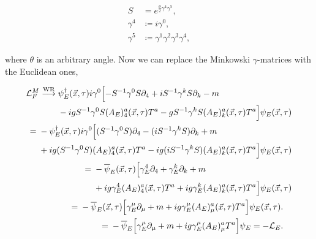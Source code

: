 \documentclass{article}
\theoremstyle{plain} %
\theoremstyle{convention} %
\theoremstyle{remark} %
\numberwithin{equation}{section}
\begin{document}
\begin{align*}
    S &= e^{\frac{\theta}{2} \gamma^4 \gamma^5 }, \\
    \gamma^4 &\coloneqq i \gamma^0, \\
    \gamma^5 &\coloneqq \gamma^1 \gamma^2 \gamma^3 \gamma^4,
\end{align*}

where $\theta$ is an arbitrary angle. Now we can replace the Minkowski $\gamma$-matrices with the Euclidean ones,

\begin{align*}
\begin{split}
    \mathcal{L}_{F}^M \stackrel{\text{WR}}{\longrightarrow}{}& \psi_E^{\dagger}(\vec{x},\tau) i \gamma^0 \Bigl[ - S^{-1} \gamma^0 S \partial_4 + i S^{-1} \gamma^k S \partial_k - m\\
         & - i g S^{-1} \gamma^0 S (A_E)_4^a(\vec{x}, \tau) T^a - g S^{-1} \gamma^k S (A_E)_k^a(\vec{x}, \tau) T^a \Bigr] \psi_E(\vec{x},\tau)
\end{split} \\
\begin{split}
    ={}& - \psi_E^{\dagger}(\vec{x},\tau) i \gamma^0 \Bigl[ (S^{-1} \gamma^0 S) \partial_4 - (i S^{-1} \gamma^k S) \partial_k + m\\
         & + i g (S^{-1} \gamma^0 S) (A_E)_4^a(\vec{x}, \tau) T^a - i g (i S^{-1} \gamma^k S) (A_E)_k^a(\vec{x}, \tau) T^a \Bigr] \psi_E(\vec{x},\tau)
\end{split} \\
\begin{split}
    ={}& - \overline{\psi}_E(\vec{x},\tau) \Bigl[ \gamma_E^4 \partial_4 + \gamma_E^k \partial_k + m \\
         & + ig \gamma_E^4 (A_E)_4^a(\vec{x}, \tau) T^a + ig \gamma_E^k (A_E)_k^a(\vec{x}, \tau) T^a \Bigr] \psi_E(\vec{x},\tau)
\end{split} \\
\begin{split}
    ={}& - \overline{\psi}_E(\vec{x},\tau) \Bigl[ \gamma_E^{\mu} \partial_{\mu} + m + ig \gamma_E^{\mu} (A_E)_{\mu}^a(\vec{x}, \tau) T^a \Bigr] \psi_E(\vec{x},\tau).
\end{split} \\
\begin{split}
    ={}& - \overline{\psi}_E \Bigl[ \gamma_E^{\mu} \partial_{\mu} + m + ig \gamma_E^{\mu} (A_E)_{\mu}^a T^a \Bigr] \psi_E = - \mathcal{L}_E.
\end{split}
\end{align*}
\end{document}
